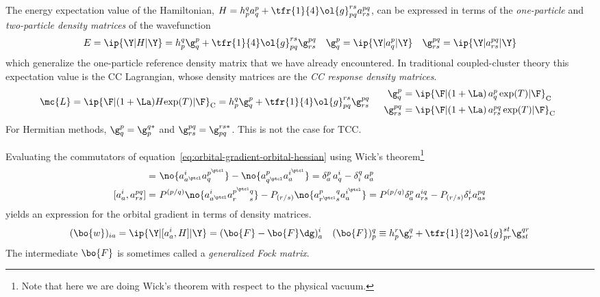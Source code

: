 \begin{dfn}
The energy expectation value of the Hamiltonian,
$
  H
=
  h_p^q
  a^p_q
+
  \tfr{1}{4}
  \ol{g}_{pq}^{rs}
  a^{pq}_{rs}
$,
can be expressed in terms of the \textit{one-particle} and \textit{two-particle density matrices} of the wavefunction
\begin{align}
\label{eq:one-and-two-particle-density-matrices}
  E
=
  \ip{\Y|H|\Y}
=
  h_p^q
  \g^p_q
+
  \tfr{1}{4}
  \ol{g}_{pq}^{rs}
  \g^{pq}_{rs}
&&
  \g^p_q
=
  \ip{\Y|a^p_q|\Y}
&&
  \g^{pq}_{rs}
=
  \ip{\Y|a^{pq}_{rs}|\Y}
\end{align}
which generalize the one-particle reference density matrix that we have already encountered.
In traditional coupled-cluster theory this expectation value is the CC Lagrangian, whose density matrices are the \textit{CC response density matrices}.
\begin{align}
  \mc{L}
=
  \ip{\F|(1+\La)H\text{exp}(T)|\F}_{\text{C}}
=
  h_p^q
  \g^p_q
+
  \tfr{1}{4}
  \ol{g}_{pq}^{rs}
  \g^{pq}_{rs}
&&
\begin{array}{r@{\ }l}
  \g^p_q
&=
  \ip{\F|(1 + \La)\, a^p_q\,\text{exp}(T)|\F}_{\text{C}}
\\[5pt]
  \g^{pq}_{rs}
&=
  \ip{\F|(1 + \La)\, a^{pq}_{rs}\,\text{exp}(T)|\F}_{\text{C}}
\end{array}
\end{align} 
For Hermitian methods, $\g^p_q=\g^{q*}_{p}$ and $\g^{pq}_{rs}=\g^{rs*}_{pq}$.
This is not the case for TCC.
\end{dfn}


\begin{rmk}
Evaluating the commutators of equation~\ref{eq:orbital-gradient-orbital-hessian} using Wick's theorem\footnote{
  Note that here we are doing Wick's theorem with respect to the physical vacuum.
}
\begin{align}
  [a_a^i, a^p_q]
=&\
  \no{
    a^i_{a^\ptcl}
    a^{p^\ptcl}_q
  }
-
  \no{
    a^p_{q^\ptcl}
    a^{i^\ptcl}_a
  }
=
  \delta^p_a\,
  a^i_q
-
  \delta^q_i\,
  a^p_a
\\
  [a_a^i, a^{pq}_{rs}]
=&\
  P^{(p/q)}
  \no{
    a^i_{a^\ptcl}
    a^{p^\ptcl q}_{r^{\phantom\ptcl}s}
  }
-
  P_{(r/s)}
  \no{
    a^{p^{\phantom\ptcl}q}_{r^\ptcl s}
    a^{i^\ptcl}_a
  }
=
  P^{(p/q)}
  \delta^p_a\,
  a^{iq}_{rs}
-
  P_{(r/s)}
  \delta^i_r
  a^{pq}_{as}
\end{align}
yields an expression for the orbital gradient in terms of density matrices.
\begin{align}
  (\bo{w})_{ia}
=
  \ip{\Y|[a_a^i, H]|\Y}
=
  (
    \bo{F}
  -
    \bo{F}\dg
  )_a^i
&&
  (\bo{F})_p^q
\equiv
  h_p^r
  \g^q_r
+
  \tfr{1}{2}
  \ol{g}_{pr}^{st}
  \g^{qr}_{st}
\end{align}
The intermediate $\bo{F}$ is sometimes called a \textit{generalized Fock matrix}.
\end{rmk}

